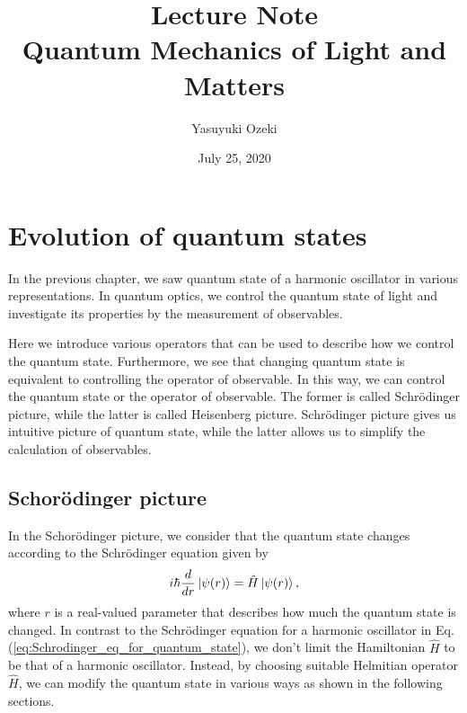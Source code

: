 \documentclass{book}
\begin{document}
\title{Lecture Note \\ Quantum Mechanics of Light and Matters}
\author{Yasuyuki Ozeki}
\date{July 25, 2020}

\maketitle
\tableofcontents
\mainmatter







\chapter{Evolution of quantum states}
In the previous chapter, we saw quantum state of a harmonic oscillator in various representations. In quantum optics, we control the quantum state of light and investigate its properties by the measurement of observables. 

Here we introduce various operators that can be used to describe how we control the quantum state. Furthermore, we see that changing quantum state is equivalent to controlling the operator of observable. In this way, we can control the quantum state or the operator of observable. The former is called Schr\"odinger picture, while the latter is called Heisenberg picture. Schr\"odinger picture gives us intuitive picture of quantum state, while the latter allows us to simplify the calculation of observables. 


\section{Schor\"odinger picture}
In the Schor\"odinger picture, we consider that the quantum state changes according to the Schr\"odinger equation given by
\begin{equation}
  i\hbar \frac{d}{dr}\ket {\psi(r)} = \hat H \ket{\psi(r)},
  \label{eq:Schorodinger_equation_for_evolution}
\end{equation}
where $r$ is a real-valued parameter that describes how much the quantum state is changed. In contrast to the Schr\"odinger equation for a harmonic oscillator in Eq. (\ref{eq:Schrodinger_eq_for_quantum_state}), we don't limit the Hamiltonian $\hat H$ to be that of a harmonic oscillator. Instead, by choosing suitable Helmitian operator $\hat H$, we can modify the quantum state in various ways as shown in the following sections.
\end{document}
